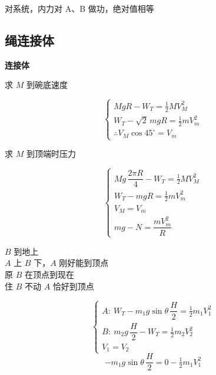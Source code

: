 对系统，内力对 A、B 做功，绝对值相等

\subsection{绳连接体}
\textbf{连接体}
\begin{problem}[①]
求 $M$ 到碗底速度
\begin{solution}
\[
\begin{cases}
MgR-W_T=\tfrac12 MV_M^2\\
W_T-\sqrt2\,mgR=\tfrac12 mV_m^2\\
\therefore V_M\cos45^\circ=V_m
\end{cases}
\]
\end{solution}
\end{problem}

\begin{problem}[②]
求 $M$ 到顶端时压力
\begin{solution}
\[
\begin{cases}
Mg\,\dfrac{2\pi R}{4}-W_T=\tfrac12 MV_M^2\\[4pt]
W_T-mgR=\tfrac12 mV_m^2\\[2pt]
V_M=V_m\\
mg-N=\dfrac{mV_m^2}{R}
\end{cases}
\]
\end{solution}
\end{problem}

\begin{problem}
$B$ 到地上\\
$A$ 上 $B$ 下，$A$ 刚好能到顶点\\
原 $B$ 在顶点到现在\\
住 $B$ 不动 $A$ 恰好到顶点
\begin{solution}
\[
\begin{cases}
A:\ W_T-m_1g\sin\theta\,\dfrac{H}{2}=\tfrac12 m_1V_1^2\\[4pt]
B:\ m_2g\,\dfrac{H}{2}-W_T=\tfrac12 m_2V_2^2\\[4pt]
V_1=V_2
\end{cases}
\]
\[
-m_1g\sin\theta\,\dfrac{H}{2}=0-\tfrac12 m_1V_1^2
\]
\end{solution}
\end{problem}

